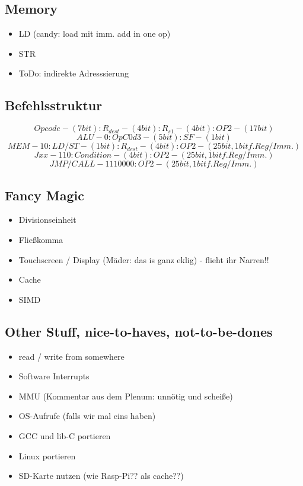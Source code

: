 \documentclass[a4paper]{article}
\begin{document}
\begin{multicols}{2}
\subsection{Memory}

\begin{itemize}
\item LD (candy: load mit imm. add in one op)
\item STR
\item ToDo: indirekte Adresssierung
\end{itemize}
\end{multicols}


\subsection{Befehlsstruktur}
\[Opcode - (7bit) : R_{dest} - (4bit) : R_{s1} - (4bit) : OP2 - (17bit)\]
\[ALU - 0 : OpC0d3 - (5bit) : SF - (1bit)\]
\[MEM - 10 : LD/ST - (1bit) : R_{dest} - (4bit) : OP2 - (25bit, 1bit f. Reg / Imm.)\]
\[Jxx - 110 : Condition - (4bit) : OP2 - (25bit, 1bit f. Reg / Imm.)\]
\[JMP/CALL - 1110000 : OP2 - (25bit, 1bit f. Reg / Imm.)\]

\subsection{Fancy Magic}

\begin{itemize}
\item Divisionseinheit
\item Fließkomma
\item Touchscreen / Display (Mäder: das is ganz eklig) - flieht ihr Narren!!
\item Cache
\item SIMD
\end{itemize}


\subsection{Other Stuff, nice-to-haves, not-to-be-dones}

\begin{itemize}
\item read / write from somewhere
\item Software Interrupts
\item MMU (Kommentar aus dem Plenum: unnötig und scheiße)
\item OS-Aufrufe (falls wir mal eins haben)
\item GCC und lib-C portieren
\item Linux portieren
\item SD-Karte nutzen (wie Rasp-Pi?? als cache??)
\end{itemize}
\end{document}

